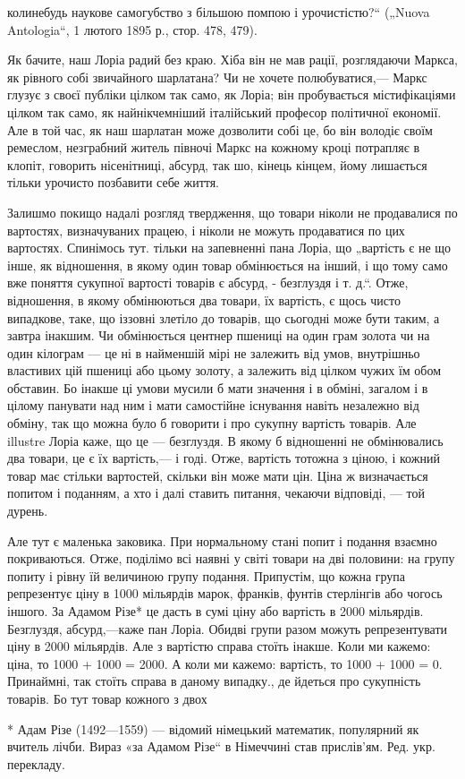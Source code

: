 \parcont{}  %
колинебудь наукове самогубство з більшою помпою і урочистістю?“  („Nuova Antologia“, 1 лютого
1895 р., стор. 478, 479).

Як бачите, наш Лоріа радий без краю. Хіба він не мав рації, розглядаючи
Маркса, як рівного собі звичайного шарлатана?  Чи не хочете полюбуватися,— Маркс глузує з своєї
публіки цілком так само, як Лоріа; він пробувається містифікаціями цілком так само, як
найнікчемніший італійський професор політичної економії. Але в той час, як наш шарлатан може
дозволити собі це, бо він володіє своїм ремеслом, незграбний житель півночі Маркс на кожному
кроці потрапляє в клопіт, говорить нісенітниці, абсурд, так шо, кінець кінцем, йому лишається
тільки урочисто позбавити себе життя.

Залишмо покищо надалі розгляд твердження, що товари ніколи
не продавалися по вартостях, визначуваних працею, і ніколи не можуть продаватися по цих
вартостях. Спинімось тут. тільки на запевненні пана Лоріа, що „вартість є не що інше, як
відношення, в якому один товар обмінюється на інший, і що тому само вже поняття сукупної вартості
товарів є абсурд, - безглуздя і т. д.“. Отже, відношення, в якому обмінюються два товари, їх
вартість, є щось чисто випадкове, таке, що іззовні злетіло до товарів, що сьогодні може бути
таким, а завтра інакшим. Чи обмінюється центнер пшениці на один грам золота чи на один кілограм —
це ні в найменшій мірі не залежить від умов, внутрішньо властивих цій пшениці або цьому золоту,
а залежить від цілком чужих їм обом обставин. Бо інакше ці умови мусили б мати значення і в
обміні, загалом і в цілому панувати над ним і мати самостійне існування навіть незалежно від
обміну, так що можна було б говорити і про сукупну вартість товарів. Але illustre Лоріа каже, що
це — безглуздя. В якому б відношенні не обмінювались два товари, це є їх вартість,— і годі.
Отже, вартість тотожна з ціною, і кожний товар має стільки вартостей, скільки він може мати цін.
Ціна ж визначається попитом і поданням, а хто і далі ставить питання, чекаючи відповіді, — той
дурень.

Але тут є маленька заковика. При нормальному стані попит і подання взаємно покриваються.
Отже, поділімо всі наявні у світі товари на дві половини: на групу попиту і рівну їй величиною
групу подання. Припустім, що кожна група репрезентує ціну в 1000 мільярдів марок, франків,
фунтів стерлінгів або чогось іншого. За Адамом Різе* це дасть в сумі ціну або вартість в 2000
мільярдів. Безглуздя, абсурд,—каже пан Лоріа. Обидві групи разом можуть репрезентувати ціну в
2000 мільярдів. Але з вартістю справа стоїть інакше. Коли ми кажемо:  ціна, то 1000 + 1000 =
2000. А коли ми кажемо: вартість, то 1000 + 1000 = 0. Принаймні, так стоїть справа в даному
випадку., де йдеться про сукупність товарів. Бо тут товар кожного з двох

* Адам Різе (1492—1559) — відомий німецький математик, популярний як вчитель лічби. Вираз «за Адамом Різе“ в Німеччині став прислів’ям. Ред. укр. перекладу.
\parbreak{}
